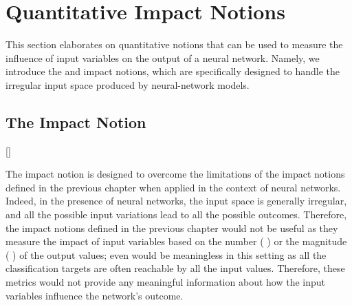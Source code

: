 
\section{Quantitative Impact Notions}

This section elaborates on quantitative notions that can be used to measure the influence of input variables on the output of a neural network.
Namely, we introduce the \changesname{} and \qlibraname{} impact notions, which are specifically designed to handle the irregular input space produced by neural-network models.

\subsection{The \changesname{} Impact Notion}[\changesname]


The \changesname{} impact notion is designed to overcome the limitations of the impact notions defined in the previous chapter when applied in the context of neural networks.
Indeed, in the presence of neural networks, the input space is generally irregular, and all the possible input variations lead to all the possible outcomes.
Therefore, the impact notions defined in the previous chapter would not be useful as they measure the impact of input variables based on the number (\eg{} \outcomesname{}) or the magnitude (\eg{} \rangename{}) of the output values; even \qusedname{} would be meaningless in this setting as all the classification targets are often reachable by all the input values.
Therefore, these metrics would not provide any meaningful information about how the input variables influence the network's outcome.

